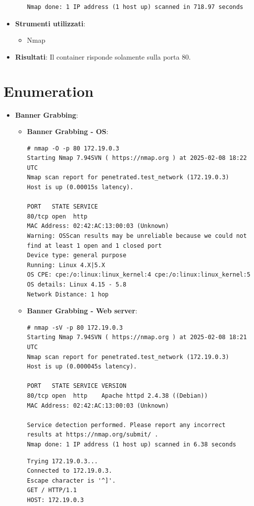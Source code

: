\documentclass[12pt]{article}
\begin{document}
\begin{itemize}
\begin{itemize}
\begin{lstlisting}[label=shell, basicstyle=\tiny]
Nmap done: 1 IP address (1 host up) scanned in 718.97 seconds
        \end{lstlisting}
    \end{itemize}
    \item \textbf{Strumenti utilizzati}:
    \begin{itemize}
        \item Nmap
    \end{itemize}
    \item \textbf{Risultati}: Il container risponde solamente sulla porta 80.
\end{itemize} 

\section{Enumeration}
    \begin{itemize}
        \item \textbf{Banner Grabbing}:
        \begin{itemize}
            \item \textbf{Banner Grabbing - OS}:
            \begin{lstlisting}[label=shell, basicstyle=\tiny]
# nmap -O -p 80 172.19.0.3
Starting Nmap 7.94SVN ( https://nmap.org ) at 2025-02-08 18:22 UTC
Nmap scan report for penetrated.test_network (172.19.0.3)
Host is up (0.00015s latency).

PORT   STATE SERVICE
80/tcp open  http
MAC Address: 02:42:AC:13:00:03 (Unknown)
Warning: OSScan results may be unreliable because we could not find at least 1 open and 1 closed port
Device type: general purpose
Running: Linux 4.X|5.X
OS CPE: cpe:/o:linux:linux_kernel:4 cpe:/o:linux:linux_kernel:5
OS details: Linux 4.15 - 5.8
Network Distance: 1 hop
            \end{lstlisting}
            \item \textbf{Banner Grabbing - Web server}:
            \begin{lstlisting}[label=shell, basicstyle=\tiny]
# nmap -sV -p 80 172.19.0.3
Starting Nmap 7.94SVN ( https://nmap.org ) at 2025-02-08 18:21 UTC
Nmap scan report for penetrated.test_network (172.19.0.3)
Host is up (0.000045s latency).

PORT   STATE SERVICE VERSION
80/tcp open  http    Apache httpd 2.4.38 ((Debian))
MAC Address: 02:42:AC:13:00:03 (Unknown)

Service detection performed. Please report any incorrect results at https://nmap.org/submit/ .
Nmap done: 1 IP address (1 host up) scanned in 6.38 seconds            
            \end{lstlisting}
            \begin{lstlisting}[label=shell, basicstyle=\tiny]
Trying 172.19.0.3...
Connected to 172.19.0.3.
Escape character is '^]'.
GET / HTTP/1.1
HOST: 172.19.0.3


\end{lstlisting}
\end{itemize}
\end{itemize}
\end{document}
